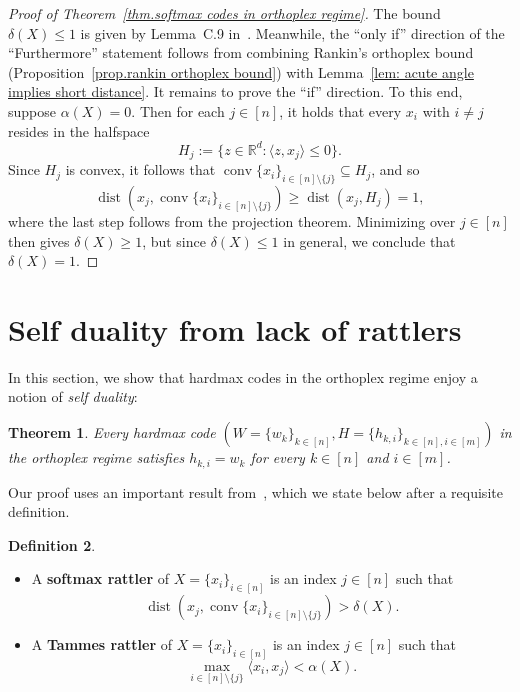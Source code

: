 \documentclass{article}
\theoremstyle{plain}
\newtheorem{theorem}{Theorem}
\theoremstyle{definition}
\newtheorem{definition}[theorem]{Definition}
\begin{document}
\begin{proof}[Proof of Theorem~\ref{thm.softmax codes in orthoplex regime}]
The bound $\delta(X)\leq 1$ is given by Lemma~C.9 in~\cite{JiangEtal:24}.
Meanwhile, the ``only if'' direction of the ``Furthermore'' statement follows from combining Rankin's orthoplex bound (Proposition~\ref{prop.rankin orthoplex bound}) with Lemma~\ref{lem: acute angle implies short distance}.
It remains to prove the ``if'' direction.
To this end, suppose $\alpha(X)=0$.
Then for each $j\in[n]$, it holds that every $x_i$ with $i\neq j$ resides in the halfspace
\[
H_j
:=\{z\in\mathbb{R}^d:\langle z,x_j\rangle\leq 0\}.
\]
Since $H_j$ is convex, it follows that $\operatorname{conv}\{x_i\}_{i\in[n]\setminus\{j\}}\subseteq H_j$, and so
\[
\operatorname{dist}(x_j,\operatorname{conv}\{x_i\}_{i\in[n]\setminus\{j\}})
\geq \operatorname{dist}(x_j,H_j)
= 1,
\]
where the last step follows from the projection theorem.
Minimizing over $j\in[n]$ then gives $\delta(X)\geq 1$, but since $\delta(X)\leq 1$ in general, we conclude that $\delta(X)=1$.
\end{proof}


\section{Self duality from lack of rattlers}
\label{sec.self duality}

In this section, we show that hardmax codes in the orthoplex regime enjoy a notion of \textit{self duality}:

\begin{theorem}
\label{thm.selfduality}
Every hardmax code $(W=\{w_k\}_{k\in[n]},H=\{h_{k,i}\}_{k\in[n],i\in[m]})$ in the orthoplex regime satisfies $h_{k,i}=w_k$ for every $k\in[n]$ and $i\in[m]$.
\end{theorem}

Our proof uses an important result from~\cite{JiangEtal:24}, which we state below after a requisite definition.

\begin{definition}\
\begin{itemize}
\item[(a)]
A \textbf{softmax rattler} of $X = \{x_i\}_{i\in[n]}$ is an index $j\in[n]$ such that
\[
\operatorname{dist}(x_j, \operatorname{conv}\{x_i\}_{i \in [n] \setminus \{j\}})
>\delta(X).
\]
\item[(b)]
A \textbf{Tammes rattler} of $X = \{x_i\}_{i\in[n]}$ is an index $j\in[n]$ such that
\[
\max_{i\in[n]\setminus\{j\}}\langle x_i,x_j\rangle
<\alpha(X).
\]
\end{itemize}
\end{definition}
\end{document}

